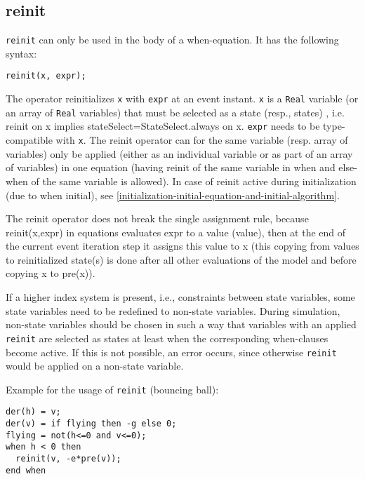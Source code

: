 \subsection{reinit}

\lstinline!reinit! can only be used in the body of a when-equation.  It has the following syntax:
\begin{lstlisting}[language=modelica]
reinit(x, expr);
\end{lstlisting}

The operator reinitializes \lstinline!x! with \lstinline!expr! at an event instant. \lstinline!x! is a
\lstinline!Real!
variable (or an array of \lstinline!Real! variables) that must be selected as a
state (resp., states) , i.e. reinit on x implies
stateSelect=StateSelect.always on x. \lstinline!expr! needs to be type-compatible
with \lstinline!x!. The reinit operator can for the same variable (resp. array of
variables) only be applied (either as an individual variable or as part
of an array of variables) in one equation (having reinit of the same
variable in when and else-when of the same variable is allowed). In case
of reinit active during initialization (due to when initial), see
\autoref{initialization-initial-equation-and-initial-algorithm}.

The reinit operator does not break the single assignment rule, because
reinit(x,expr) in equations evaluates expr to a value (value), then at
the end of the current event iteration step it assigns this value to x
(this copying from values to reinitialized state(s) is done after all
other evaluations of the model and before copying x to pre(x)).

\begin{example}
If a higher index system is present, i.e., constraints between
state variables, some state variables need to be redefined to non-state
variables. During simulation, non-state variables should be chosen in
such a way that variables with an applied \lstinline!reinit! are
selected as states at least when the corresponding when-clauses become
active. If this is not possible, an error occurs, since otherwise
\lstinline!reinit! would be applied on a non-state variable.

Example for the usage of \lstinline!reinit! (bouncing ball):
\begin{lstlisting}[language=modelica]
der(h) = v;
der(v) = if flying then -g else 0;
flying = not(h<=0 and v<=0);
when h < 0 then
  reinit(v, -e*pre(v));
end when
\end{lstlisting}
\end{example}

